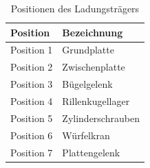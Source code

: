 \documentclass[../../main.tex]{subfiles}
\begin{document}
    \begin{table}[H] \centering
        \begin{tabular}{|l|l|}
        \hline
        \textbf{Position} & \textbf{Bezeichnung}\\
        \hline
        Position 1          & Grundplatte\\
         \hline
        Position 2          & Zwischenplatte\\
        \hline
        Position 3          & Bügelgelenk\\
        \hline
        Position 4          & Rillenkugellager\\
        \hline
        Position 5          & Zylinderschrauben\\
        \hline
        Position 6          & Würfelkran\\
        \hline
        Position 7          & Plattengelenk\\
        \hline
        \end{tabular}

        \caption{Positionen des Ladungsträgers}
        \label{tab:pos_ladungstraeger}
        \end{table}
\end{document}
